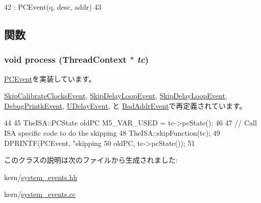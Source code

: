 \begin{DoxyCode}
42         : PCEvent(q, desc, addr)
43     {}
\end{DoxyCode}


\subsection{関数}
\hypertarget{classSkipFuncEvent_ad66a9d5ec7cfe597b848a17c0df5cc28}{
\subsubsection[{process}]{\setlength{\rightskip}{0pt plus 5cm}void process ({\bf ThreadContext} $\ast$ {\em tc})}}
\label{classSkipFuncEvent_ad66a9d5ec7cfe597b848a17c0df5cc28}


\hyperlink{classPCEvent_af6ff225900b7b98c08880da7225b38f0}{PCEvent}を実装しています。

\hyperlink{classFreebsdAlphaSystem_1_1SkipCalibrateClocksEvent_ad66a9d5ec7cfe597b848a17c0df5cc28}{SkipCalibrateClocksEvent}, \hyperlink{structLinuxAlphaSystem_1_1SkipDelayLoopEvent_ad66a9d5ec7cfe597b848a17c0df5cc28}{SkipDelayLoopEvent}, \hyperlink{classLinuxMipsSystem_1_1SkipDelayLoopEvent_ad66a9d5ec7cfe597b848a17c0df5cc28}{SkipDelayLoopEvent}, \hyperlink{classLinux_1_1DebugPrintkEvent_a7f346b2e15a406283e587b1123735488}{DebugPrintkEvent}, \hyperlink{classLinux_1_1UDelayEvent_a7f346b2e15a406283e587b1123735488}{UDelayEvent}, と \hyperlink{classBadAddrEvent_ad66a9d5ec7cfe597b848a17c0df5cc28}{BadAddrEvent}で再定義されています。


\begin{DoxyCode}
44 {
45     TheISA::PCState oldPC M5_VAR_USED = tc->pcState();
46 
47     // Call ISA specific code to do the skipping
48     TheISA::skipFunction(tc);
49     DPRINTF(PCEvent, "skipping %
50             oldPC, tc->pcState());
51 }
\end{DoxyCode}


このクラスの説明は次のファイルから生成されました:\begin{DoxyCompactItemize}
\item 
kern/\hyperlink{system__events_8hh}{system\_\-events.hh}\item 
kern/\hyperlink{system__events_8cc}{system\_\-events.cc}\end{DoxyCompactItemize}
